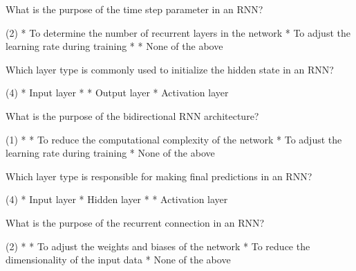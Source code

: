 \documentclass[10pt]{extarticle}
\begin{document}
\begin{exercise}
    What is the purpose of the time step parameter in an RNN?
    \begin{choice} (2)
        * To determine the number of recurrent layers in the network
        * To adjust the learning rate during training
        * 
        * None of the above
    \end{choice}
\end{exercise}
\begin{solution}
\end{solution}

\begin{exercise}
    Which layer type is commonly used to initialize the hidden state in an RNN?
    \begin{choice} (4)
        * Input layer
        * 
        * Output layer
        * Activation layer
    \end{choice}
\end{exercise}
\begin{solution}
\end{solution}

\begin{exercise}
    What is the purpose of the bidirectional RNN architecture?
    \begin{choice} (1)
        * 
        * To reduce the computational complexity of the network
        * To adjust the learning rate during training
        * None of the above
    \end{choice}
\end{exercise}
\begin{solution}
\end{solution}

\begin{exercise}
    Which layer type is responsible for making final predictions in an RNN?
    \begin{choice} (4)
        * Input layer
        * Hidden layer
        * 
        * Activation layer
    \end{choice}
\end{exercise}
\begin{solution}
\end{solution}

\begin{exercise}
    What is the purpose of the recurrent connection in an RNN?
    \begin{choice} (2)
        * 
        * To adjust the weights and biases of the network
        * To reduce the dimensionality of the input data
        * None of the above
    \end{choice}
\end{exercise}
\begin{solution}
\end{solution}
\end{document}
